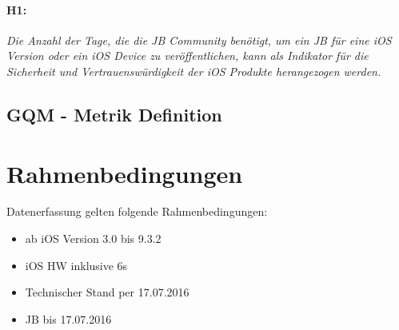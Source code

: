 \paragraph{H1:} \textit{\glqq Die Anzahl der Tage, die die JB Community benötigt, um ein JB für eine iOS Version oder ein iOS Device zu veröffentlichen, kann als Indikator für die Sicherheit und Vertrauenswürdigkeit der iOS Produkte herangezogen werden.\grqq{}}

\subsection{GQM - Metrik Definition}
\label{sec:GQMMetrik}

\section{Rahmenbedingungen}
\label{sec:Rahmenbedingungen}
Datenerfassung gelten folgende Rahmenbedingungen:
\begin{itemize}
    \item ab iOS Version 3.0 bis 9.3.2
    \item iOS HW inklusive 6s
    \item Technischer Stand per 17.07.2016
    \item JB bis 17.07.2016
\end{itemize}






    